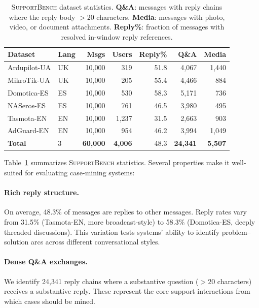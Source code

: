 \documentclass[11pt]{article}
\newcommand{\supportbench}{\textsc{SupportBench}}
\begin{document}
\begin{table}[t]
\centering
\small
\begin{tabular}{llrrrrr}
\toprule
\textbf{Dataset} & \textbf{Lang} & \textbf{Msgs} & \textbf{Users} & \textbf{Reply\%} & \textbf{Q\&A} & \textbf{Media} \\
\midrule
Ardupilot-UA   & UK & 10{,}000 & 319  & 51.8 & 4{,}067 & 1{,}440 \\
MikroTik-UA    & UK & 10{,}000 & 205  & 55.4 & 4{,}466 & 884 \\
Domotica-ES    & ES & 10{,}000 & 530  & 58.3 & 5{,}171 & 736 \\
NASeros-ES     & ES & 10{,}000 & 761  & 46.5 & 3{,}980 & 495 \\
Tasmota-EN     & EN & 10{,}000 & 1{,}237 & 31.5 & 2{,}663 & 903 \\
AdGuard-EN     & EN & 10{,}000 & 954  & 46.2 & 3{,}994 & 1{,}049 \\
\midrule
\textbf{Total} & 3  & \textbf{60{,}000} & \textbf{4{,}006} & 48.3 & \textbf{24{,}341} & \textbf{5{,}507} \\
\bottomrule
\end{tabular}
\caption{\supportbench{} dataset statistics. \textbf{Q\&A}: messages with reply chains where the reply body $>$20 characters. \textbf{Media}: messages with photo, video, or document attachments. \textbf{Reply\%}: fraction of messages with resolved in-window reply references.}
\label{tab:supportbench}
\end{table}

Table~\ref{tab:supportbench} summarizes \supportbench{} statistics. Several properties make it well-suited for evaluating case-mining systems:

\paragraph{Rich reply structure.} On average, 48.3\% of messages are replies to other messages. Reply rates vary from 31.5\% (Tasmota-EN, more broadcast-style) to 58.3\% (Domotica-ES, deeply threaded discussions). This variation tests systems' ability to identify problem--solution arcs across different conversational styles.

\paragraph{Dense Q\&A exchanges.} We identify 24{,}341 reply chains where a substantive question ($>$20 characters) receives a substantive reply. These represent the core support interactions from which cases should be mined.
\end{document}

